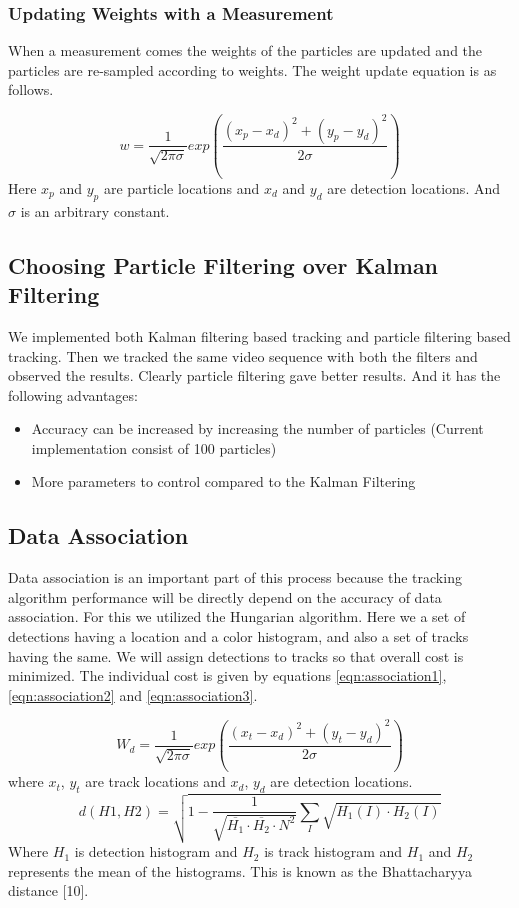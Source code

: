 \documentclass[12pt,a4paper]{report}
\begin{document}
\subsubsection{Updating Weights with a Measurement}
When a measurement comes the weights of the particles are updated and the particles are re-sampled according to weights. The weight update equation is as follows.

\begin{equation}
w = \frac{1}{\sqrt{2\pi\sigma }}exp\left (\frac{(x_p-x_d)^2+ (y_p-y_d)^2}{2\sigma }\right )
\end{equation}
Here $x_p$ and $y_p$ are particle locations and $x_d$ and $y_d$ are detection locations. And $\sigma$ is an arbitrary constant.

\subsection{Choosing Particle Filtering over Kalman Filtering}
We implemented both Kalman filtering based tracking and particle filtering based tracking. Then we tracked the same video sequence with both the filters and observed the results. Clearly particle filtering gave better results. And it has the following advantages:
\begin{itemize}
\item Accuracy can be increased by increasing the number of particles (Current implementation consist of 100 particles)
\item More parameters to control compared to the Kalman Filtering
\end{itemize}

\subsection{Data Association}
Data association is an important part of this process because the tracking algorithm performance will be directly depend on the accuracy of data association. For this we utilized the Hungarian algorithm. Here we a set of detections having a location and a color histogram, and also a set of tracks having the same. We will assign detections to tracks so that overall cost is minimized. The individual cost is given by equations \ref{eqn:association1},  \ref{eqn:association2} and \ref{eqn:association3}.

\begin{equation}
\label{eqn:association1}
W_d = \frac{1}{\sqrt{2\pi \sigma }}exp\left (\frac{(x_t-x_d)^2+ (y_t-y_d)^2}{2\sigma }\right )
\end{equation}
where $x_t$, $y_t$ are track locations and $x_d$, $y_d$ are detection locations.
\begin{equation}
\label{eqn:association2}
d(H1,H2)=\sqrt{1-\frac{1}{\sqrt{\overline{H_1}\cdot \overline{H_2}\cdot N^2}}\sum_{I}^{ }\sqrt{H_1(I)\cdot H_2(I)}}
\end{equation}
Where $H_1$ is detection histogram and $H_2$ is track histogram and $H_1$ and $H_2$  represents the mean of the histograms. This is known as the Bhattacharyya distance [10].
\end{document}
